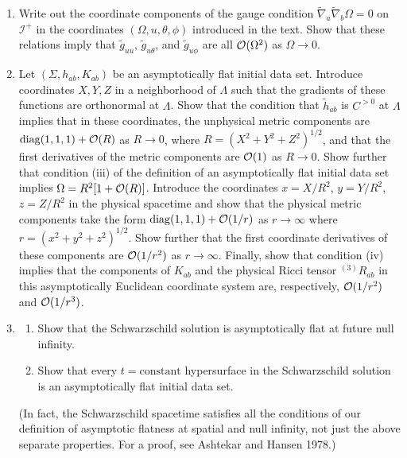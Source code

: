 
\chapterproblems

\begin{enumerate}[label=\arabic*.,leftmargin=2em,itemsep=1.2ex]
\item
Write out the coordinate components of the gauge condition
\(\tilde\nabla_a\tilde\nabla_b\Omega=0\) on \(\mathcal I^+\) in the coordinates
\((\Omega,u,\theta,\phi)\) introduced in the text. Show that these relations imply
that \(\tilde g_{uu}\), \(\tilde g_{u\theta}\), and \(\tilde g_{u\phi}\) are all
\(\mathcal{O}(\Omega^2)\) as \(\Omega\to0\).

\item
Let \((\Sigma,h_{ab},K_{ab})\) be an asymptotically flat initial data set. Introduce
coordinates \(X,Y,Z\) in a neighborhood of \(\Lambda\) such that the gradients of
these functions are orthonormal at \(\Lambda\). Show that the condition that
\(\tilde h_{ab}\) is \(C^{>0}\) at \(\Lambda\) implies that in these coordinates, the
unphysical metric components are \(\operatorname{diag}(1,1,1)+\mathcal{O}(R)\) as \(R\to0\), where
\(R=(X^2+Y^2+Z^2)^{1/2}\), and that the first derivatives of the metric components
are \(\mathcal{O}(1)\) as \(R\to0\). Show further that condition (iii) of the definition of
an asymptotically flat initial data set implies
\(\Omega=R^2[1+\mathcal{O}(R)]\). Introduce the coordinates
\(x=X/R^2\), \(y=Y/R^2\), \(z=Z/R^2\) in the physical spacetime and show that the
physical metric components take the form \(\operatorname{diag}(1,1,1)+\mathcal{O}(1/r)\) as
\(r\to\infty\) where \(r=(x^2+y^2+z^2)^{1/2}\). Show further that the first
coordinate derivatives of these components are \(\mathcal{O}(1/r^2)\) as \(r\to\infty\).
Finally, show that condition (iv) implies that the components of \(K_{ab}\) and the
physical Ricci tensor \({}^{(3)}R_{ab}\) in this asymptotically Euclidean coordinate
system are, respectively, \(\mathcal{O}(1/r^2)\) and \(\mathcal{O}(1/r^3)\).

\item
\begin{enumerate}[label=\alph*),leftmargin=2em,itemsep=.45ex]
\item Show that the Schwarzschild solution is asymptotically flat at future null
infinity.
\item Show that every \(t=\text{constant}\) hypersurface in the Schwarzschild
solution is an asymptotically flat initial data set.
\end{enumerate}
\noindent
(In fact, the Schwarzschild spacetime satisfies all the conditions of our definition
of asymptotic flatness at spatial and null infinity, not just the above separate
properties. For a proof, see Ashtekar and Hansen 1978.)


\end{enumerate}
